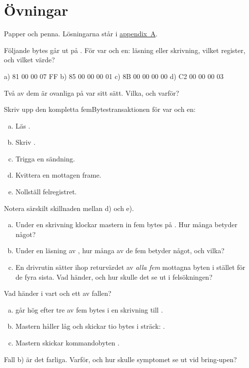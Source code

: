 \section*{Övningar}

Papper och penna. Lösningarna står i \hyperref[ch:losningar]{appendix~A}.

\label{ex:8:1}
Följande bytes går ut på . För var och en: läsning eller skrivning, vilket register,
och vilket värde?
\begin{console}
a)  81 00 00 07 FF
b)  85 00 00 00 01
c)  8B 00 00 00 00
d)  C2 00 00 00 03
\end{console}
Två av dem är ovanliga på var sitt sätt. Vilka, och varför?

\label{ex:8:2}
Skriv upp den kompletta femBytestransaktionen för var och en:
\begin{enumerate}[a)]
  \item Läs .
  \item Skriv .
  \item Trigga en sändning.
  \item Kvittera en mottagen frame.
  \item Nollställ felregistret.
\end{enumerate}
Notera särskilt skillnaden mellan d) och e).

\label{ex:8:3}
\begin{enumerate}[a)]
  \item Under en skrivning klockar mastern in fem bytes på . Hur många betyder något?
  \item Under en läsning av , hur många av de fem betyder något, och vilka?
  \item En drivrutin sätter ihop returvärdet av \emph{alla fem} mottagna byten i stället för de
    fyra sista. Vad händer, och hur skulle det se ut i felsökningen?
\end{enumerate}

\label{ex:8:4}
Vad händer i vart och ett av fallen?
\begin{enumerate}[a)]
  \item {} går hög efter tre av fem bytes i en skrivning till .
  \item Mastern håller  låg och skickar tio bytes i sträck:
    .
  \item Mastern skickar kommandobyten .
\end{enumerate}
Fall b) är det farliga. Varför, och hur skulle symptomet se ut vid bring-upen?

